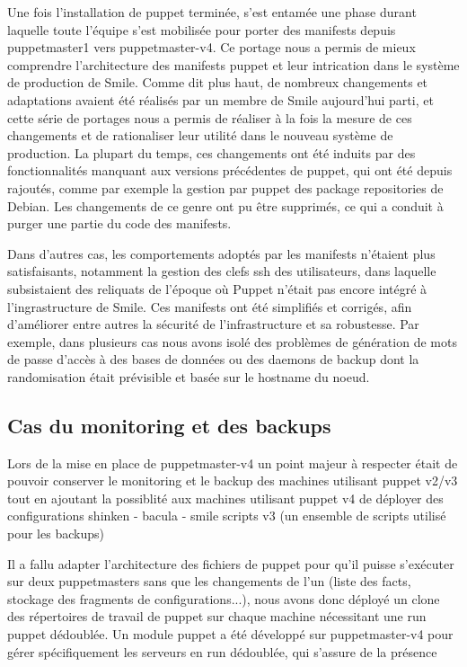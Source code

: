 \documentclass[14 pt]{extreport}
\begin{document}
Une fois l'installation de puppet terminée, s'est entamée une phase durant laquelle toute l'équipe s'est mobilisée pour porter des manifests depuis puppetmaster1 vers puppetmaster-v4. Ce portage nous a permis de mieux comprendre l'architecture des manifests puppet et leur intrication dans le système de production de Smile. Comme dit plus haut, de nombreux changements et adaptations avaient été réalisés par un membre de Smile aujourd'hui parti, et cette série de portages nous a permis de réaliser à la fois la mesure de ces changements et de rationaliser leur utilité dans le nouveau système de production. La plupart du temps, ces changements ont été induits par des fonctionnalités manquant aux versions précédentes de puppet, qui ont été depuis rajoutés, comme par exemple la gestion par puppet des package repositories de Debian. Les changements de ce genre ont pu être supprimés, ce qui a conduit à purger une partie du code des manifests.

Dans d'autres cas, les comportements adoptés par les manifests n'étaient plus satisfaisants, notamment la gestion des clefs ssh des utilisateurs, dans laquelle subsistaient des reliquats de l'époque où Puppet n'était pas encore intégré à l'ingrastructure de Smile. Ces manifests ont été simplifiés et corrigés, afin d'améliorer entre autres la sécurité de l'infrastructure et sa robustesse. Par exemple, dans plusieurs cas nous avons isolé des problèmes de génération de mots de passe d'accès à des bases de données ou des daemons de backup dont la randomisation était prévisible et basée sur le hostname du noeud.

\subsection{Cas du monitoring et des backups}

Lors de la mise en place de puppetmaster-v4 un point majeur à respecter était de pouvoir conserver le monitoring et le backup des machines utilisant puppet v2/v3 tout en ajoutant la possiblité aux machines utilisant puppet v4 de déployer des configurations shinken - bacula - smile scripts v3 (un ensemble de scripts utilisé pour les backups)

Il a fallu adapter l'architecture des fichiers de puppet pour qu'il puisse s'exécuter sur deux puppetmasters sans que les changements de l'un (liste des facts, stockage des fragments de configurations...), nous avons donc déployé un clone des répertoires de travail de puppet sur chaque machine nécessitant une run puppet dédoublée. Un module puppet a été développé sur puppetmaster-v4 pour gérer spécifiquement les serveurs en run dédoublée, qui s'assure de la présence 
\end{document}
